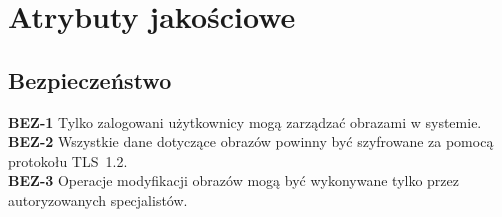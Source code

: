 \documentclass{scrreprt}
\begin{document}
\chapter{Atrybuty jako\'sciowe}

\section{Bezpieczeństwo}
\textbf{\textcolor{myBlue}{BEZ-1}} Tylko zalogowani użytkownicy mogą zarządzać obrazami w systemie. \\ 
\textbf{\textcolor{myBlue}{BEZ-2}} Wszystkie dane dotyczące obrazów powinny być szyfrowane za pomocą protokołu TLS~1.2. \\ 
\textbf{\textcolor{myBlue}{BEZ-3}} Operacje modyfikacji obrazów mogą być wykonywane tylko przez autoryzowanych specjalistów. \\ 
\end{document}
